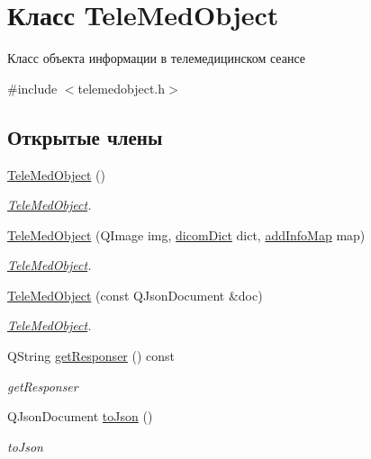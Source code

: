 \hypertarget{classTeleMedObject}{}\section{Класс Tele\+Med\+Object}
\label{classTeleMedObject}


Класс объекта информации в телемедицинском сеансе  




{\ttfamily \#include $<$telemedobject.\+h$>$}

\subsection*{Открытые члены}
\begin{DoxyCompactItemize}
\item 
\hyperlink{classTeleMedObject_a754462ce944702c386aa3b6191e4db33}{Tele\+Med\+Object} ()
\begin{DoxyCompactList}\small\item\em \hyperlink{classTeleMedObject}{Tele\+Med\+Object}. \end{DoxyCompactList}\item 
\hyperlink{classTeleMedObject_a38ee0e32441775b2f4f10907b672af44}{Tele\+Med\+Object} (Q\+Image img, \hyperlink{tagshelpers_8h_ae25d30658f61420b88a380dc9e40bb74}{dicom\+Dict} dict, \hyperlink{dbform_8h_a1ec1a645f41e1c6544d384ca863a936c}{add\+Info\+Map} map)
\begin{DoxyCompactList}\small\item\em \hyperlink{classTeleMedObject}{Tele\+Med\+Object}. \end{DoxyCompactList}\item 
\hyperlink{classTeleMedObject_ac0e5013f81a28e85101305fd8b7f6a59}{Tele\+Med\+Object} (const Q\+Json\+Document \&doc)
\begin{DoxyCompactList}\small\item\em \hyperlink{classTeleMedObject}{Tele\+Med\+Object}. \end{DoxyCompactList}\item 
Q\+String \hyperlink{classTeleMedObject_a5d79f3bf01cc9ee2b714f9fa1da422df}{get\+Responser} () const
\begin{DoxyCompactList}\small\item\em get\+Responser \end{DoxyCompactList}\item 
Q\+Json\+Document \hyperlink{classTeleMedObject_a37d8e7cede94ef1695171d35c6c0c1ce}{to\+Json} ()
\begin{DoxyCompactList}\small\item\em to\+Json \end{DoxyCompactList}\item 

\end{DoxyCompactItemize}

